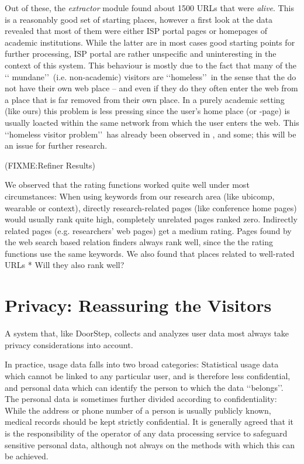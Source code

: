 \documentclass[a4paper]{danarticle}
\theoremstyle{remark}
\begin{document}
      Out of these, the \textit{extractor} module found about 1500 URLs that
      were \textit{alive}. This is a reasonably good set of starting places,
      however a first look at the data revealed that most of them were either
      ISP portal pages or homepages of academic institutions. While the latter
      are in most cases good starting points for further processing, ISP portal
      are rather unspecific and uninteresting in the context of this system.
      This behaviour is mostly due to the fact that many of the \lq\lq
      mundane\rq\rq\ (i.e. non-academic) visitors are \lq\lq homeless\rq\rq\ in
      the sense that the do not have their own web place -- and even if they do
      they often enter the web from a place that is far removed from their own
      place. In a purely academic setting (like ours) this problem is less
      pressing since the user's home place (or -page) is usually loacted within
      the same network from which the user enters the web. This \lq\lq homeless
      visitor problem\rq\rq\ has already been observed in \cite{webaware}, and 
      some; this will be an issue for further research.
      
      (FIXME:Refiner Results)
      
      We observed that the rating functions worked quite well under most 
      circumstances: When using keywords from our research area (like ubicomp, 
      wearable or context), directly research-related pages (like conference 
      home pages) would usually rank quite high, completely unrelated pages 
      ranked zero. Indirectly related pages (e.g. researchers' web pages)
      get a medium rating. Pages found by the web search based relation finders 
      always rank well, since the the rating functions use the same keywords. We 
      also found that places related to well-rated URLs 
      * Will they also rank well?
  \section{Privacy: Reassuring the Visitors}
    A system that, like DoorStep, collects and analyzes user data most always 
    take privacy considerations into account. 
    
    In practice, usage data falls into two broad categories: Statistical usage 
    data which cannot be linked to any particular user, and is therefore less 
    confidential, and personal data which can identify the 
    person to which the data \lq\lq belongs\rq\rq . The personal data is 
    sometimes further divided according to confidentiality: While the address or 
    phone number of a person is usually publicly known, medical records should 
    be kept strictly confidential. It is generally agreed that it is the 
    responsibility of the operator of any data processing service to safeguard 
    sensitive personal data, although not always on the methods with which this 
    can be achieved. 
    
\end{document}
